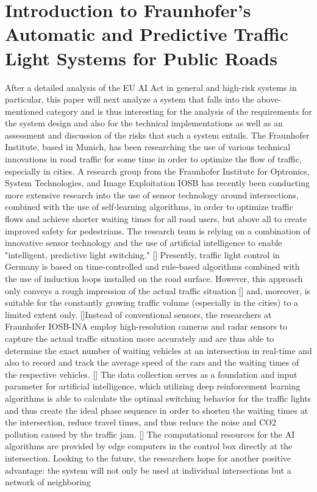 \section*{Introduction to Fraunhofer's Automatic and Predictive Traffic Light Systems for Public Roads}
  After a detailed analysis of the EU AI Act in general and high-risk systems in particular, this paper will next analyze a system that falls into the above-mentioned category and is thus interesting for the analysis of the requirements for the system design and also for the technical implementations as well as an assessment and discussion of the risks that such a system entails.\newline
The Fraunhofer Institute, based in Munich, has been researching the use of various technical innovations in road traffic for some time in order to optimize the flow of traffic, especially in cities. A research group from the Fraunhofer Institute for Optronics, System Technologies, and Image Exploitation IOSB has recently been conducting more extensive research into the use of sensor technology around intersections, combined with the use of self-learning algorithms, in order to optimize traffic flows and achieve shorter waiting times for all road users, but above all to create improved safety for pedestrians. The research team is relying on a combination of innovative sensor technology and the use of artificial intelligence to enable "intelligent, predictive light switching." [\citet{optimized_traffic_flows_and_improved_pedestrian_safety_2022}] Presently, traffic light control in Germany is based on time-controlled and rule-based algorithms combined with the use of induction loops installed on the road surface. However, this approach only conveys a rough impression of the actual traffic situation [\citet{bmdv_2022}] and, moreover, is suitable for the constantly growing traffic volume (especially in the cities) to a limited extent only. [\citet{publisher_2022}]\newline Instead of conventional sensors, the researchers at Fraunhofer IOSB-INA employ high-resolution cameras and radar sensors to capture the actual traffic situation more accurately and are thus able to determine the exact number of waiting vehicles at an intersection in real-time and also to record and track the average speed of the cars and the waiting times of the respective vehicles.  [\citet{optimized_traffic_flows_and_improved_pedestrian_safety_2022}] The data collection serves as a foundation and input parameter for artificial intelligence, which utilizing deep reinforcement learning algorithms is able to calculate the optimal switching behavior for the traffic lights and thus create the ideal phase sequence in order to shorten the waiting times at the intersection, reduce travel times, and thus reduce the noise and CO2 pollution caused by the traffic jam. [\citet{fraunhofertrustworthy}] \newline The computational resources for the AI algorithms are provided by edge computers in the control box directly at the intersection. Looking to the future, the researchers hope for another positive advantage: the system will not only be used at individual intersections but a network of neighboring 